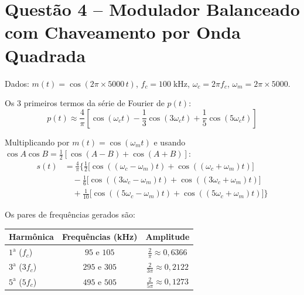 \documentclass[11pt,a4paper]{article}
\begin{document}
\section*{Questão 4 -- Modulador Balanceado com Chaveamento por Onda Quadrada}

\begin{resolucao}

Dados: $m(t) = \cos(2\pi \times 5000\,t)$, $f_c = 100\;\text{kHz}$, $\omega_c = 2\pi f_c$, $\omega_m = 2\pi \times 5000$.

Os 3 primeiros termos da série de Fourier de $p(t)$:
\[
  p(t) \approx \frac{4}{\pi}\left[\cos(\omega_c t) - \frac{1}{3}\cos(3\omega_c t) + \frac{1}{5}\cos(5\omega_c t)\right]
\]

Multiplicando por $m(t) = \cos(\omega_m t)$ e usando $\cos A \cos B = \frac{1}{2}[\cos(A-B) + \cos(A+B)]$:
\begin{align*}
  s(t) &= \frac{4}{\pi}\bigg\{
    \frac{1}{2}\big[\cos((\omega_c - \omega_m)t) + \cos((\omega_c + \omega_m)t)\big] \\
  &\quad - \frac{1}{6}\big[\cos((3\omega_c - \omega_m)t) + \cos((3\omega_c + \omega_m)t)\big] \\
  &\quad + \frac{1}{10}\big[\cos((5\omega_c - \omega_m)t) + \cos((5\omega_c + \omega_m)t)\big]
  \bigg\}
\end{align*}

Os pares de frequências gerados são:
\begin{center}
\small
\begin{tabular}{lcc}
  \toprule
  Harmônica & Frequências (kHz) & Amplitude \\
  \midrule
  $1^{\text{a}}$ ($f_c$) & $95$ e $105$ & $\frac{2}{\pi} \approx 0{,}6366$ \\[4pt]
  $3^{\text{a}}$ ($3f_c$) & $295$ e $305$ & $\frac{2}{3\pi} \approx 0{,}2122$ \\[4pt]
  $5^{\text{a}}$ ($5f_c$) & $495$ e $505$ & $\frac{2}{5\pi} \approx 0{,}1273$ \\
  \bottomrule
\end{tabular}
\end{center}
\end{resolucao}
\end{document}

